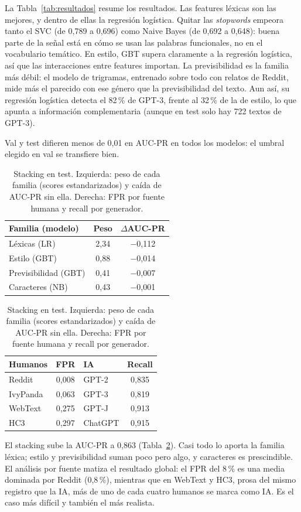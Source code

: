 \documentclass[runningheads]{llncs}
\begin{document}
La Tabla~\ref{tab:resultados} resume los resultados. Las features léxicas son las mejores, y
dentro de ellas la regresión logística. Quitar las \emph{stopwords} empeora tanto el SVC (de
0,789 a 0,696) como Naive Bayes (de 0,692 a 0,648): buena parte de la señal está en cómo se usan las palabras
funcionales, no en el vocabulario temático. En estilo, GBT supera claramente a la regresión
logística, así que las interacciones entre features importan. La previsibilidad es la familia
más débil: el modelo de trigramas, entrenado sobre todo con relatos de Reddit, mide más el
parecido con ese género que la previsibilidad del texto. Aun así, su regresión logística
detecta el 82\,\% de GPT-3, frente al 32\,\% de la de estilo, lo que apunta a información
complementaria (aunque en test solo hay 722 textos de GPT-3).

Val y test difieren menos de 0,01 en AUC-PR en todos los modelos: el umbral elegido en val se
transfiere bien.

\begin{table}
\centering
\caption{Stacking en test. Izquierda: peso de cada familia (scores estandarizados) y caída
de AUC-PR sin ella. Derecha: FPR por fuente humana y recall por generador.}
\label{tab:stacking}
\small
\begin{tabular}{lcc}
\toprule
Familia (modelo) & Peso & $\Delta$AUC-PR \\
\midrule
Léxicas (LR) & 2,34 & $-$0,112 \\
Estilo (GBT) & 0,88 & $-$0,014 \\
Previsibilidad (GBT) & 0,41 & $-$0,007 \\
Caracteres (NB) & 0,43 & $-$0,001 \\
\bottomrule
\end{tabular}
\hspace{0.6em}
\begin{tabular}{lc@{\hspace{1.5em}}lc}
\toprule
Humanos & FPR & IA & Recall \\
\midrule
Reddit & 0,008 & GPT-2 & 0,835 \\
IvyPanda & 0,063 & GPT-3 & 0,819 \\
WebText & 0,275 & GPT-J & 0,913 \\
HC3 & 0,297 & ChatGPT & 0,915 \\
\bottomrule
\end{tabular}
\end{table}

El stacking sube la AUC-PR a 0,863 (Tabla~\ref{tab:stacking}). Casi todo lo aporta la familia
léxica; estilo y previsibilidad suman poco pero algo, y caracteres es prescindible. El análisis
por fuente matiza el resultado global: el FPR del 8\,\% es una media dominada por Reddit
(0,8\,\%), mientras que en WebText y HC3, prosa del mismo registro que la IA, más de uno de cada
cuatro humanos se marca como IA. Es el caso más difícil y también el más realista.
\end{document}
